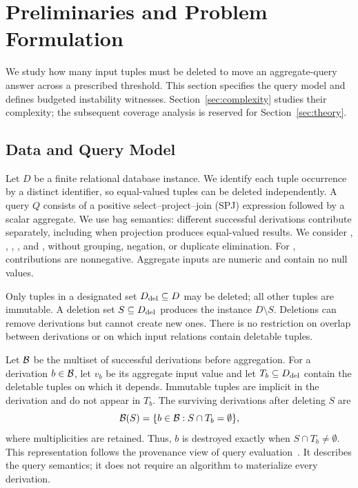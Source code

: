 \section{Preliminaries and Problem Formulation}
\label{sec:problem}

We study how many input tuples must be deleted to move an aggregate-query
answer across a prescribed threshold. This section specifies the query
model and defines budgeted instability witnesses. Section~\ref{sec:complexity}
studies their complexity; the subsequent coverage analysis is reserved
for Section~\ref{sec:theory}.

\subsection{Data and Query Model}
\label{sec:setting}

Let $D$ be a finite relational database instance. We identify each tuple
occurrence by a distinct identifier, so equal-valued tuples can be deleted
independently. A query $Q$ consists of a positive select--project--join
(SPJ) expression followed by a scalar aggregate. We use bag semantics:
different successful derivations contribute separately, including when
projection produces equal-valued results. We consider ,
, , , and , without grouping,
negation, or duplicate elimination. For , contributions are
nonnegative. Aggregate inputs are numeric and contain no null values.

Only tuples in a designated set $D_{\mathrm{del}}\subseteq D$ may be deleted; all other
tuples are immutable. A deletion set $S\subseteq D_{\mathrm{del}}$ produces the instance
$D\setminus S$. Deletions can remove derivations but cannot create new ones.
There is no restriction on overlap between derivations or on which input
relations contain deletable tuples.

Let $\mathcal{B}$ be the multiset of successful derivations before aggregation.
For a derivation $b\in\mathcal{B}$, let $v_b$ be its aggregate input value and let
$T_b\subseteq D_{\mathrm{del}}$ contain the deletable tuples on which it depends.
Immutable tuples are implicit in the derivation and do not appear in $T_b$.
The surviving derivations after deleting $S$ are
\begin{equation}
\label{eq:surviving-derivations}
\mathcal{B}(S)=\{b\in\mathcal{B}:S\cap T_b=\emptyset\},
\end{equation}
where multiplicities are retained. Thus, $b$ is destroyed exactly when
$S\cap T_b\ne\emptyset$. This representation follows the provenance view of query
evaluation~\cite{buneman2001whywhere,green2007provenance,amsterdamer2011aggregate}.
It describes the query semantics; it does not require an algorithm to
materialize every derivation.

